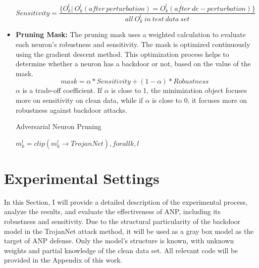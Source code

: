 \documentclass[english,version-2022-01]{uzl-thesis}
\begin{document}
\begin{itemize}
    $$Sensitivity = \frac{\{O_{k}^{l}|\ O_{k}^{l}(after \ perturbation)=O_{k}^{l}(after \ de-perturbation)\}}{all\ O_{k}^{l}\ in\ test\ data\ set}$$
    \item \textbf{Pruning Mask:} The pruning mask uses a weighted calculation to evaluate each neuron's robustness and sensitivity. The mask is optimized continuously using the gradient descent method. This optimization process helps to determine whether a neuron has a backdoor or not, based on the value of the mask.
    \label{mask}
    $$mask =\alpha*Sensitivity+(1-\alpha)*Robustness$$
    $\alpha$ is a trade-off coefficient. If $\alpha$ is close to 1, the minimization object focuses more on sensitivity on clean data, while if $\alpha$ is close to 0, it focuses more on robustness against backdoor attacks.
    \begin{algorithm}
    \caption{Adversarial Neuron Pruning}
    $m_{k}^{l}=clip(m_{k}^{l}\rightarrow TrojanNet), for all k,l$\;
    \end{algorithm}
\end{itemize}
\section{Experimental Settings} In this Section, I will provide a detailed description of the experimental process, analyze the results, and evaluate the effectiveness of ANP, including its robustness and sensitivity. Due to the structural particularity of the backdoor model in the TrojanNet attack method, it will be used as a gray box model as the target of ANP defense. Only the model's structure is known, with unknown weights and partial knowledge of the clean data set. All relevant code will be provided in the Appendix of this work. 
\end{document}
